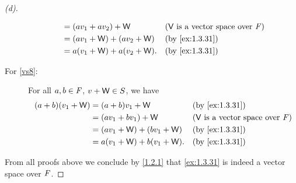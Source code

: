 \begin{proof}[(d)]
\begin{description}
\begin{align*}
                                   & = (av_1 + av_2) + \W         &  & \text{(\(\V\) is a vector space over \(\F\))} \\
                                   & = (av_1 + \W) + (av_2 + \W)  &  & \text{(by \cref{ex:1.3.31})}                  \\
                                   & = a(v_1 + \W) + a(v_2 + \W). &  & \text{(by \cref{ex:1.3.31})}
      \end{align*}
    \item[For \ref{vs8}:]
      For all \(a, b \in \mathit{F}\), \(v + \mathsf{W} \in S\), we have
      \begin{align*}
        (a + b) (v_1 + \W) & = (a + b) v_1 + \W           &  & \text{(by \cref{ex:1.3.31})}                  \\
                           & = (av_1 + bv_1) + \W         &  & \text{(\(\V\) is a vector space over \(\F\))} \\
                           & = (av_1 + \W) + (bv_1 + \W)  &  & \text{(by \cref{ex:1.3.31})}                  \\
                           & = a(v_1 + \W) + b(v_1 + \W). &  & \text{(by \cref{ex:1.3.31})}
      \end{align*}
  \end{description}
  From all proofs above we conclude by \cref{1.2.1} that \cref{ex:1.3.31} is indeed a vector space over \(\mathit{F}\).
\end{proof}
